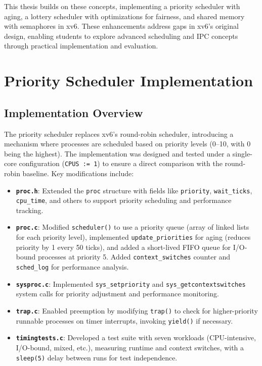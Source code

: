 \documentclass[12pt]{article}
\begin{document}
This thesis builds on these concepts, implementing a priority scheduler with aging, a lottery scheduler with optimizations for fairness, and shared memory with semaphores in xv6. These enhancements address gaps in xv6’s original design, enabling students to explore advanced scheduling and IPC concepts through practical implementation and evaluation.

\section{Priority Scheduler Implementation}
\label{sec:priority-scheduler}

\subsection{Implementation Overview}
\label{subsec:priority-implementation}

The priority scheduler replaces xv6’s round-robin scheduler, introducing a mechanism where processes are scheduled based on priority levels (0–10, with 0 being the highest). The implementation was designed and tested under a single-core configuration (\texttt{CPUS := 1}) to ensure a direct comparison with the round-robin baseline. Key modifications include:

\begin{itemize}
    \item \textbf{\texttt{proc.h}}: Extended the \texttt{proc} structure with fields like \texttt{priority}, \texttt{wait\_ticks}, \texttt{cpu\_time}, and others to support priority scheduling and performance tracking.
    \item \textbf{\texttt{proc.c}}: Modified \texttt{scheduler()} to use a priority queue (array of linked lists for each priority level), implemented \texttt{update\_priorities} for aging (reduces priority by 1 every 50 ticks), and added a short-lived FIFO queue for I/O-bound processes at priority 5. Added \texttt{context\_switches} counter and \texttt{sched\_log} for performance analysis.
    \item \textbf{\texttt{sysproc.c}}: Implemented \texttt{sys\_setpriority} and \texttt{sys\_getcontextswitches} system calls for priority adjustment and performance monitoring.
    \item \textbf{\texttt{trap.c}}: Enabled preemption by modifying \texttt{trap()} to check for higher-priority runnable processes on timer interrupts, invoking \texttt{yield()} if necessary.
    \item \textbf{\texttt{timingtests.c}}: Developed a test suite with seven workloads (CPU-intensive, I/O-bound, mixed, etc.), measuring runtime and context switches, with a \texttt{sleep(5)} delay between runs for test independence.
\end{itemize}
\end{document}
